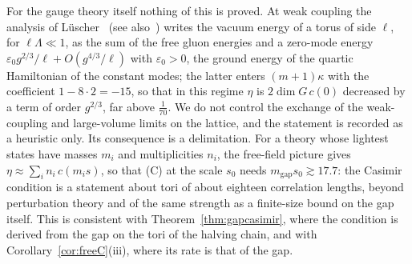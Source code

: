 For the gauge theory itself nothing of this is proved. At weak coupling the
analysis of L\"uscher~\cite{Lus83} (see also~\cite{KvB87}) writes the vacuum
energy of a torus of side $\ell$, for $\ell\Lambda\ll1$, as the sum of the free
gluon energies and a zero-mode energy $\varepsilon_0g^{2/3}/\ell+O(g^{4/3}/
\ell)$ with $\varepsilon_0>0$, the ground energy of the quartic Hamiltonian of
the constant modes; the latter enters $(m+1)\kappa$ with the coefficient $1-
8\cdot2=-15$, so that in this regime $\eta$ is $2\dim G\,c(0)$ decreased by a
term of order $g^{2/3}$, far above $\frac1{70}$. We do not control the
exchange of the weak-coupling and large-volume limits on the lattice, and
the statement is recorded as a heuristic only. Its consequence is a
delimitation. For a theory whose lightest states have masses $m_i$ and
multiplicities $n_i$, the free-field picture gives $\eta\approx\sum_in_i\,c(m_i
s)$, so that (C) at the scale $s_0$ needs $m_{\mathrm{gap}}s_0\gtrsim17.7$: the
Casimir condition is a statement about tori of about eighteen correlation
lengths, beyond perturbation theory and of the same strength as a finite-size
bound on the gap itself. This is consistent with Theorem~\ref{thm:gapcasimir},
where the condition is derived from the gap on the tori of the halving chain,
and with Corollary~\ref{cor:freeC}(iii), where its rate is that of the gap.
